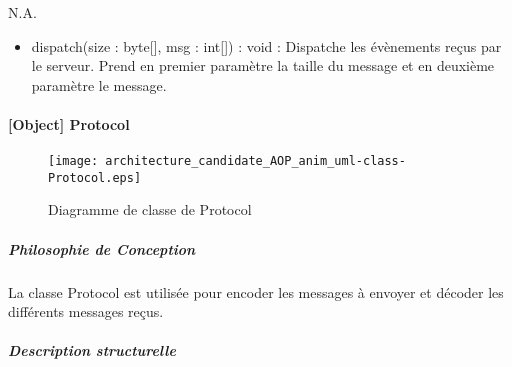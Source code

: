             N.A.
            \begin{itemize}
                \item {dispatch(size : byte[], msg : int[]) : void : Dispatche les évènements reçus par le serveur.
                Prend en premier paramètre la taille du message et en deuxième paramètre le message.}
            \end{itemize} 
            \newpage   

    \paragraph{[Object] Protocol}

        \begin{figure} [H]
            \centering
            \texttt{[image: architecture\_candidate\_AOP\_anim\_uml-class-Protocol.eps]}
            \caption{Diagramme de classe de Protocol}
            \label{Classe-Protocol}
        \end{figure}
    
            \subparagraph{Philosophie de Conception}%
            La classe Protocol est utilisée pour encoder les messages à envoyer et décoder les différents messages reçus.
            
            \subparagraph{Description structurelle}%
                
